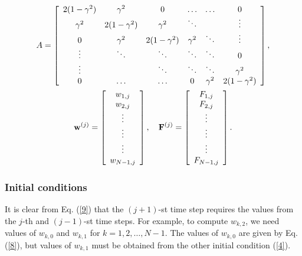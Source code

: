 \begin{gather}
A=\left[
\begin{array}{cccccc}
2(1-\gamma^{2}) &\gamma^{2} &0      &\dots  &\dots &0 \\
\gamma^{2} &2(1-\gamma^{2}) &\gamma^{2} &\ddots  &     &\vdots \\
0      &\gamma^{2} &2(1-\gamma^{2}) &\gamma^{2} &\ddots &\vdots \\
\vdots &\ddots &\ddots &\ddots &\ddots &0 \\
\vdots &       &\ddots &\ddots &\ddots &\gamma^{2} \\
0      &\dots  &\dots  &0      &\gamma^{2} &2(1-\gamma^{2})
\end{array}\right], \\
{\bf w}^{(j)}=\left[
\begin{array}{c}
w_{1,j} \\
w_{2,j} \\
\vdots \\
\vdots \\
\vdots \\
w_{N-1,j}
\end{array}\right], \quad
{\bf F}^{(j)}=\left[
\begin{array}{c}
 F_{1,j} \\
 F_{2,j} \\
\vdots \\
\vdots \\
\vdots \\
F_{N-1,j}
\end{array}\right].
\label{77}
\end{gather}


\subsubsection{Initial conditions}
It is clear from Eq. (\ref{9}) that the $(j+1)$-st time step
requires the values from the $j$-th and $(j-1)$-st time steps. For
example, to compute $w_{k,2}$, we need values of $w_{k,0}$ and
$w_{k,1}$ for $k=1, 2, \dots, N-1$. The values of $w_{k,0}$ are
given by Eq. (\ref{8}), but values of $w_{k,1}$ must be obtained
from the other initial condition (\ref{4}).

